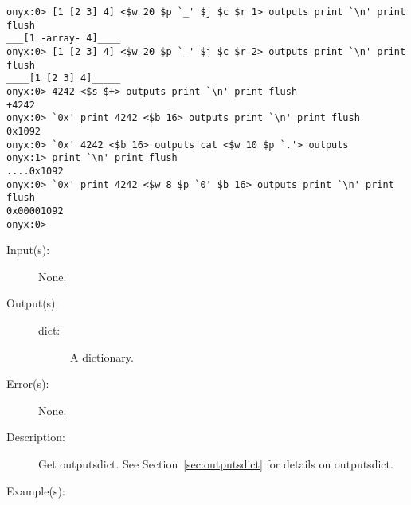 \begin{description}
\begin{description}
\begin{verbatim}
onyx:0> [1 [2 3] 4] <$w 20 $p `_' $j $c $r 1> outputs print `\n' print flush
___[1 -array- 4]____
onyx:0> [1 [2 3] 4] <$w 20 $p `_' $j $c $r 2> outputs print `\n' print flush
____[1 [2 3] 4]_____
onyx:0> 4242 <$s $+> outputs print `\n' print flush
+4242
onyx:0> `0x' print 4242 <$b 16> outputs print `\n' print flush
0x1092
onyx:0> `0x' 4242 <$b 16> outputs cat <$w 10 $p `.'> outputs
onyx:1> print `\n' print flush
....0x1092
onyx:0> `0x' print 4242 <$w 8 $p `0' $b 16> outputs print `\n' print flush
0x00001092
onyx:0>
		\end{verbatim}
	\end{description}
\label{systemdict:outputsdict}
\item[{\onyxop{--}{outputsdict}{dict}}: ]
	\begin{description}\item[]
	\item[Input(s): ] None.
	\item[Output(s): ]
		\begin{description}\item[]
		\item[dict: ]
			A dictionary.
		\end{description}
	\item[Error(s): ] None.
	\item[Description: ]
		Get outputsdict.  See Section~\ref{sec:outputsdict} for details
		on outputsdict.
	\item[Example(s): ]\begin{verbatim}


\end{verbatim}
\end{description}
\end{description}
